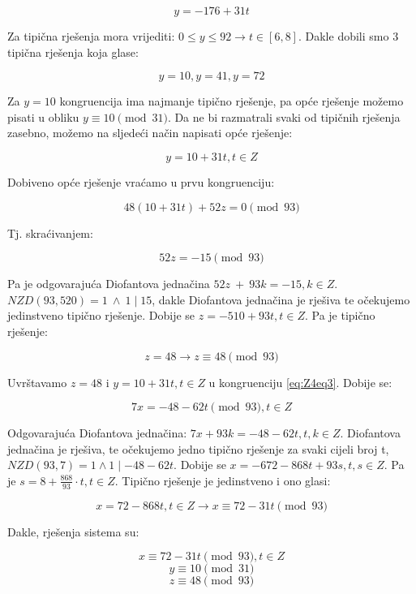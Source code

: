 \documentclass[12pt]{article}
\begin{document}
$$y = -176 + 31t$$\vspace{1mm}

Za tipična rješenja mora vrijediti: $0 \leq y \leq 92 \to t \in [6, 8]$. Dakle dobili smo 3 tipična rješenja koja glase:

$$y = 10, y = 41, y = 72$$\vspace{1mm}

Za $y = 10$ kongruencija ima najmanje tipično rješenje, pa opće rješenje možemo pisati u obliku $y \equiv 10 \pmod{31}$. Da ne bi razmatrali svaki od tipičnih rješenja zasebno, možemo na sljedeći način napisati opće rješenje:

$$y = 10 + 31t, t \in Z$$\vspace{1mm}

Dobiveno opće rješenje vraćamo u prvu kongruenciju:

$$48(10 + 31t) + 52z = 0 \pmod {93}$$\vspace{1mm}

Tj. skraćivanjem:

$$52z = -15 \pmod{93}$$\vspace{1mm}

Pa je odgovarajuća Diofantova jednačina $52z\> +\> 93k = -15, k \in Z$. $NZD(93, 520) = 1 \> \land \> 1 \mid 15$, dakle Diofantova jednačina je rješiva te očekujemo jedinstveno tipično rješenje. Dobije se $z = -510 + 93t, t \in Z$. Pa je tipično rješenje:

$$z = 48 \to z \equiv 48 \pmod{93}$$\vspace{1mm}

Uvrštavamo $z = 48$ i $y = 10 + 31t, t \in Z$ u kongruenciju \ref{eq:Z4eq3}. Dobije se:

$$7x = -48 - 62t \pmod{93}, t \in Z$$\vspace{1mm}

Odgovarajuća Diofantova jednačina: $7x + 93k = -48 - 62t, t, k \in Z$. Diofantova jednačina je rješiva, te očekujemo jedno tipično rješenje za svaki cijeli broj t, $NZD(93, 7) = 1 \land 1 \mid -48 - 62t$.
Dobije se $x = -672 -868t + 93s, t, s \in Z$. Pa je $s = 8 + \frac{868}{93} \cdot t, t \in Z$. Tipično rješenje je jedinstveno i ono glasi:

$$x = 72 - 868t, t \in Z \to x \equiv 72 - 31t \pmod{93}$$\vspace{1mm}

Dakle, rješenja sistema su:

$$x \equiv 72 - 31t \pmod{93}, t \in Z$$
$$y \equiv 10 \pmod{31}$$
$$z \equiv 48 \pmod{93}$$\vspace{1mm}
\end{document}
